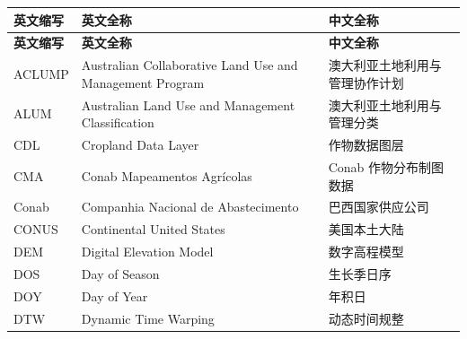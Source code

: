 \cleardoublepage
{}
\begin{center}
    \begin{longtable}{@{}m{3cm}m{7.3cm}m{4.8cm}@{}}
        \toprule
        \textbf{英文缩写}&\textbf{英文全称}&\textbf{中文全称}\\
        \midrule
        \endfirsthead
        \toprule
        \textbf{英文缩写}&\textbf{英文全称}&\textbf{中文全称}\\
        \midrule
        \endhead 
        \bottomrule
        \endfoot
        \bottomrule
        \endlastfoot
        ACLUMP&Australian Collaborative Land Use and \newline Management Program&澳大利亚土地利用与管理协作计划\\
        ALUM&Australian Land Use and Management \newline Classification&澳大利亚土地利用与管理分类\\
        CDL&Cropland Data Layer&作物数据图层\\
        CMA&Conab Mapeamentos Agrícolas&Conab 作物分布制图数据\\
        Conab&Companhia Nacional de Abastecimento&巴西国家供应公司\\
        CONUS&Continental United States&美国本土大陆\\
        DEM&Digital Elevation Model&数字高程模型\\
        DOS&Day of Season&生长季日序\\
        DOY&Day of Year&年积日\\
        DTW&Dynamic Time Warping&动态时间规整\\

\end{longtable}
\end{center}
